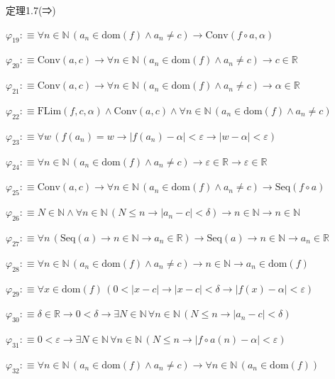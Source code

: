 \begin{fullproof}{定理1.7(⇒)}
\begin{abbrevlist}
\item $\varphi_{19} :\equiv \forall n \in \mathbb{N}\,(a_{n} \in \mathrm{dom}(f) \land a_{n} \neq c) \to \mathrm{Conv}(f \circ a,\alpha)$
\item $\varphi_{20} :\equiv \mathrm{Conv}(a,c) \to \forall n \in \mathbb{N}\,(a_{n} \in \mathrm{dom}(f) \land a_{n} \neq c) \to c \in \mathbb{R}$
\item $\varphi_{21} :\equiv \mathrm{Conv}(a,c) \to \forall n \in \mathbb{N}\,(a_{n} \in \mathrm{dom}(f) \land a_{n} \neq c) \to \alpha \in \mathbb{R}$
\item $\varphi_{22} :\equiv \mathrm{FLim}(f,c,\alpha) \land \mathrm{Conv}(a,c) \land \forall n \in \mathbb{N}\,(a_{n} \in \mathrm{dom}(f) \land a_{n} \neq c)$
\item $\varphi_{23} :\equiv \forall w\,(f(a_{n}) = w \to \lvert f(a_{n}) - \alpha \rvert < \varepsilon \to \lvert w - \alpha \rvert < \varepsilon)$
\item $\varphi_{24} :\equiv \forall n \in \mathbb{N}\,(a_{n} \in \mathrm{dom}(f) \land a_{n} \neq c) \to \varepsilon \in \mathbb{R} \to \varepsilon \in \mathbb{R}$
\item $\varphi_{25} :\equiv \mathrm{Conv}(a,c) \to \forall n \in \mathbb{N}\,(a_{n} \in \mathrm{dom}(f) \land a_{n} \neq c) \to \mathrm{Seq}(f \circ a)$
\item $\varphi_{26} :\equiv N \in \mathbb{N} \land \forall n \in \mathbb{N}\,(N \leq n \to \lvert a_{n} - c \rvert < \delta) \to n \in \mathbb{N} \to n \in \mathbb{N}$
\item $\varphi_{27} :\equiv \forall n\,(\mathrm{Seq}(a) \to n \in \mathbb{N} \to a_{n} \in \mathbb{R}) \to \mathrm{Seq}(a) \to n \in \mathbb{N} \to a_{n} \in \mathbb{R}$
\item $\varphi_{28} :\equiv \forall n \in \mathbb{N}\,(a_{n} \in \mathrm{dom}(f) \land a_{n} \neq c) \to n \in \mathbb{N} \to a_{n} \in \mathrm{dom}(f)$
\item $\varphi_{29} :\equiv \forall x \in \mathrm{dom}(f)\,(0 < \lvert x - c \rvert \to \lvert x - c \rvert < \delta \to \lvert f(x) - \alpha \rvert < \varepsilon)$
\item $\varphi_{30} :\equiv \delta \in \mathbb{R} \to 0 < \delta \to \exists N \in \mathbb{N}\,\forall n \in \mathbb{N}\,(N \leq n \to \lvert a_{n} - c \rvert < \delta)$
\item $\varphi_{31} :\equiv 0 < \varepsilon \to \exists N \in \mathbb{N}\,\forall n \in \mathbb{N}\,(N \leq n \to \lvert f \circ a(n) - \alpha \rvert < \varepsilon)$
\item $\varphi_{32} :\equiv \forall n \in \mathbb{N}\,(a_{n} \in \mathrm{dom}(f) \land a_{n} \neq c) \to \forall n \in \mathbb{N}\,(a_{n} \in \mathrm{dom}(f))$

\end{abbrevlist}
\end{fullproof}
